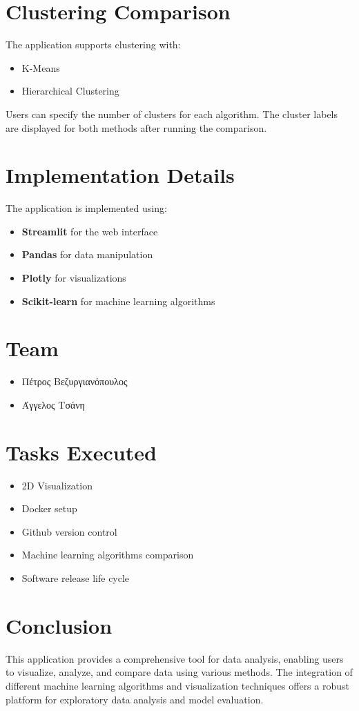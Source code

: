 \documentclass{article}
\begin{document}
\section{Clustering Comparison}
The application supports clustering with:
\begin{itemize}
    \item K-Means
    \item Hierarchical Clustering
\end{itemize}
Users can specify the number of clusters for each algorithm. The cluster labels are displayed for both methods after running the comparison.

\section{Implementation Details}
The application is implemented using:
\begin{itemize}
    \item \textbf{Streamlit} for the web interface
    \item \textbf{Pandas} for data manipulation
    \item \textbf{Plotly} for visualizations
    \item \textbf{Scikit-learn} for machine learning algorithms
\end{itemize}

\section{Team}
\begin{itemize}
    \item Πέτρος Βεζυργιανόπουλος
    \item Άγγελος Τσάνη
\end{itemize}

\section{Tasks Executed}
\begin{itemize}
    \item 2D Visualization
    \item Docker setup
    \item Github version control
    \item Machine learning algorithms comparison
    \item Software release life cycle
\end{itemize}

\section{Conclusion}
This application provides a comprehensive tool for data analysis, enabling users to visualize, analyze, and compare data using various methods. The integration of different machine learning algorithms and visualization techniques offers a robust platform for exploratory data analysis and model evaluation.
\end{document}

